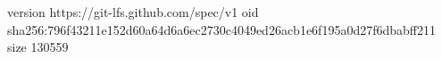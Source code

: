 version https://git-lfs.github.com/spec/v1
oid sha256:796f43211e152d60a64d6a6ec2730c4049ed26acb1e6f195a0d27f6dbabff211
size 130559
